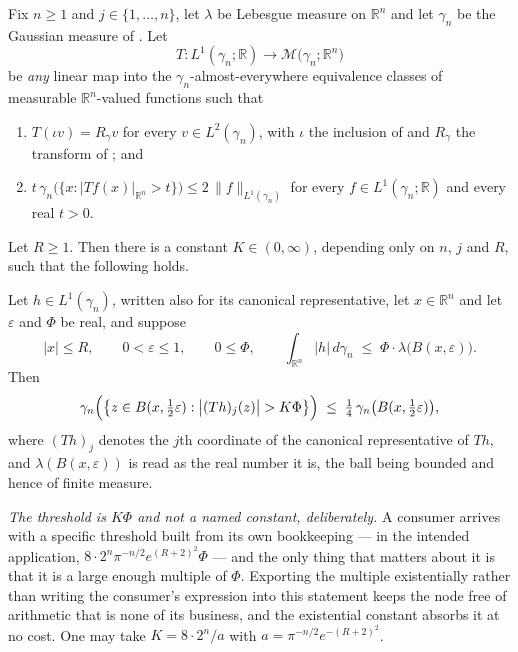 \begin{lemma}
Fix $n \geq 1$ and $j \in \{1,\ldots,n\}$, let $\lambda$ be Lebesgue measure on
$\mathbb{R}^n$ and let $\gamma_n$ be the Gaussian measure of
.  Let
\[
  T : L^1(\gamma_n;\mathbb{R}) \longrightarrow
      \mathcal{M}\bigl(\gamma_n;\mathbb{R}^n\bigr)
\]
be \emph{any} linear map into the $\gamma_n$-almost-everywhere equivalence
classes of measurable $\mathbb{R}^n$-valued functions such that
\begin{enumerate}
\item[(T1)] $T(\iota v) = R_\gamma v$ for every $v \in L^2(\gamma_n)$, with
$\iota$ the inclusion of  and $R_\gamma$ the transform of
; and
\item[(T2)] $t\,\gamma_n\bigl(\{x : |Tf(x)|_{\mathbb{R}^n} > t\}\bigr)
\leq 2\,\|f\|_{L^1(\gamma_n)}$ for every $f \in L^1(\gamma_n;\mathbb{R})$ and
every real $t > 0$.
\end{enumerate}
Let $R \geq 1$.  Then there is a constant $K \in (0,\infty)$, depending only on
$n$, $j$ and $R$, such that the following holds.

Let $h \in L^1(\gamma_n)$, written also for its canonical representative, let
$x \in \mathbb{R}^n$ and let $\varepsilon$ and $\Phi$ be real, and suppose
\[
  |x| \leq R, \qquad 0 < \varepsilon \leq 1, \qquad 0 \leq \Phi ,
  \qquad
  \int_{\mathbb{R}^n}|h|\,d\gamma_n \;\leq\; \Phi\cdot\lambda\bigl(B(x,\varepsilon)\bigr) .
\]
Then
\[
  \gamma_n\Bigl(\bigl\{z \in B(x,\tfrac12\varepsilon)
      : \bigl|(Th)_j(z)\bigr| > K\Phi\bigr\}\Bigr)
    \;\leq\; \tfrac14\,\gamma_n\bigl(B(x,\tfrac12\varepsilon)\bigr) ,
\]
where $(Th)_j$ denotes the $j$th coordinate of the canonical representative of
$Th$, and $\lambda(B(x,\varepsilon))$ is read as the real number it is, the
ball being bounded and hence of finite measure.

\emph{The threshold is $K\Phi$ and not a named constant, deliberately.}  A
consumer arrives with a specific threshold built from its own bookkeeping ---
in the intended application, $8\cdot2^n\pi^{-n/2}e^{(R+2)^2}\Phi$ --- and the
only thing that matters about it is that it is a large enough multiple of
$\Phi$.  Exporting the multiple existentially rather than writing the
consumer's expression into this statement keeps the node free of arithmetic
that is none of its business, and the existential constant absorbs it at no
cost.  One may take $K = 8\cdot2^n/a$ with
$a = \pi^{-n/2}e^{-(R+2)^2}$.


\end{lemma}
